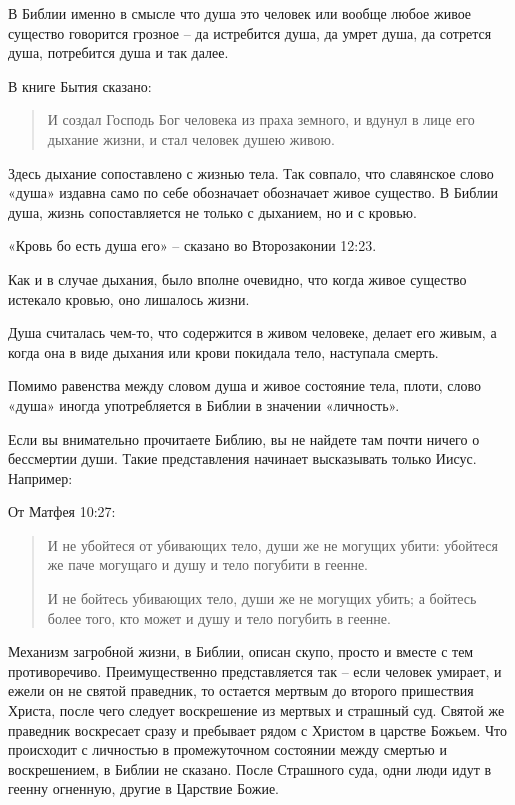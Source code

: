 \documentclass[a5paper,11pt,openany]{article}
\begin{document}
   В Библии именно в смысле что душа это человек или вообще любое живое существо говорится грозное – да истребится душа, да умрет душа, да сотрется душа, потребится душа и так далее.

   В книге Бытия сказано:

\begin{quotation}
\noindent И создал Господь Бог человека из праха земного, и вдунул в лице его дыхание жизни, и стал человек душею живою.
\end{quotation}

   Здесь дыхание сопоставлено с жизнью тела.  Так совпало, что славянское слово «душа» издавна само по себе обозначает обозначает живое существо. В Библии душа, жизнь сопоставляется не только с дыханием, но и с кровью.

«Кровь бо есть душа его» – сказано во Второзаконии 12:23.

    Как и в случае дыхания, было вполне очевидно, что когда живое существо истекало кровью, оно лишалось жизни.

   Душа считалась чем-то, что содержится в живом человеке, делает его живым, а когда она в виде дыхания или крови покидала тело, наступала смерть.

   Помимо равенства между словом душа и живое состояние тела, плоти, слово «душа» иногда употребляется в Библии в значении «личность».

    Если вы внимательно прочитаете Библию, вы не найдете там почти ничего о бессмертии души. Такие представления начинает высказывать только Иисус. Например:

От Матфея 10:27:

\begin{quotation}
\noindent И не убойтеся от убивающих тело, души же не могущих убити: убойтеся же паче могущаго и душу и тело погубити в геенне. 

И не бойтесь убивающих тело, души же не могущих убить; а бойтесь более того, кто может и душу и тело погубить в геенне. \end{quotation}

   Механизм загробной жизни, в Библии, описан скупо, просто и вместе с тем противоречиво. Преимущественно представляется так – если человек умирает, и ежели он не святой праведник, то остается мертвым до второго пришествия Христа, после чего следует воскрешение из мертвых и страшный суд. Святой же праведник воскресает сразу и пребывает рядом с Христом в царстве Божьем. Что происходит с личностью в промежуточном состоянии между смертью и воскрешением, в Библии не сказано. После Страшного суда, одни люди идут в геенну огненную, другие в Царствие Божие.
\end{document}
